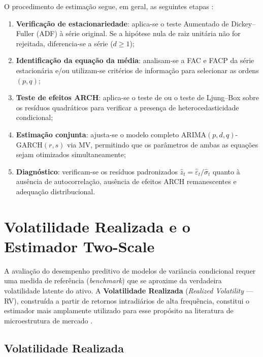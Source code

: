 O procedimento de estimação segue, em geral, as seguintes
etapas \cite{tsay2010}:

\begin{enumerate}
    \item \textbf{Verificação de estacionariedade}: aplica-se o teste
          Aumentado de Dickey--Fuller (ADF) à série original. Se a
          hipótese nula de raiz unitária não for rejeitada, diferencia-se
          a série ($d \ge 1$);
    \item \textbf{Identificação da equação da média}: analisam-se a FAC e
          FACP da série estacionária e/ou utilizam-se critérios de
          informação para selecionar as ordens $(p,q)$;
    \item \textbf{Teste de efeitos ARCH}: aplica-se o teste de
           ou o teste de Ljung--Box sobre os
          resíduos quadráticos para verificar a presença de
          heterocedasticidade condicional;
    \item \textbf{Estimação conjunta}: ajusta-se o modelo completo
          ARIMA$(p,d,q)$-GARCH$(r,s)$ via MV, permitindo que os
          parâmetros de ambas as equações sejam otimizados
          simultaneamente;
    \item \textbf{Diagnóstico}: verificam-se os resíduos padronizados
          $\hat{z}_t = \hat{\varepsilon}_t / \hat{\sigma}_t$ quanto à
          ausência de autocorrelação, ausência de efeitos ARCH
          remanescentes e adequação distribucional.
\end{enumerate}

\section{Volatilidade Realizada e o Estimador Two-Scale}
\label{sec:rv}

A avaliação do desempenho preditivo de modelos de variância condicional
requer uma medida de referência (\emph{benchmark}) que se aproxime da
verdadeira volatilidade latente do ativo. A \textbf{Volatilidade Realizada}
(\emph{Realized Volatility} --- RV), construída a partir de retornos
intradiários de alta frequência, constitui o estimador mais amplamente
utilizado para esse propósito na literatura de microestrutura de
mercado \cite{andersen2003}.

\subsection{Volatilidade Realizada}
\label{subsec:rv_definicao}

